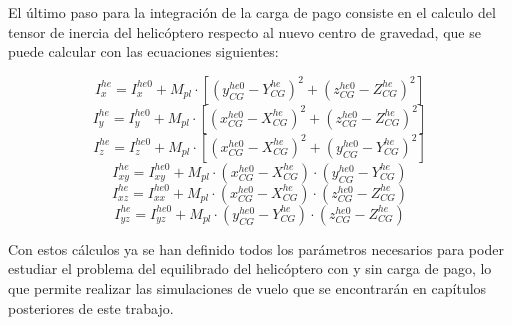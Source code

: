 El último paso para la integración de la carga de pago consiste en el calculo del tensor de inercia del helicóptero respecto al nuevo centro de gravedad, que se puede calcular con las ecuaciones siguientes:

\begin{equation}
I_x^{he}=I_x^{he0}+M_{pl}\cdot[(y_{CG}^{he0}-Y_{CG}^{he})^2+(z_{CG}^{he0}-Z_{CG}^{he})^2]
\end{equation}
\begin{equation}
I_y^{he}=I_y^{he0}+M_{pl}\cdot[(x_{CG}^{he0}-X_{CG}^{he})^2+(z_{CG}^{he0}-Z_{CG}^{he})^2]
\end{equation}
\begin{equation}
I_z^{he}=I_z^{he0}+M_{pl}\cdot[(x_{CG}^{he0}-X_{CG}^{he})^2+(y_{CG}^{he0}-Y_{CG}^{he})^2]
\end{equation}
\begin{equation}
I_{xy}^{he}=I_{xy}^{he0}+M_{pl}\cdot(x_{CG}^{he0}-X_{CG}^{he})\cdot(y_{CG}^{he0}-Y_{CG}^{he})
\end{equation}
\begin{equation}
I_{xz}^{he}=I_{xx}^{he0}+M_{pl}\cdot(x_{CG}^{he0}-X_{CG}^{he})\cdot(z_{CG}^{he0}-Z_{CG}^{he})
\end{equation}
\begin{equation}
I_{yz}^{he}=I_{yz}^{he0}+M_{pl}\cdot(y_{CG}^{he0}-Y_{CG}^{he})\cdot(z_{CG}^{he0}-Z_{CG}^{he})
\end{equation}

Con estos cálculos ya se han definido todos los parámetros necesarios para poder estudiar el problema del equilibrado del helicóptero con y sin carga de pago, lo que permite realizar las simulaciones de vuelo que se encontrarán en capítulos posteriores de este trabajo.

\singlespacing